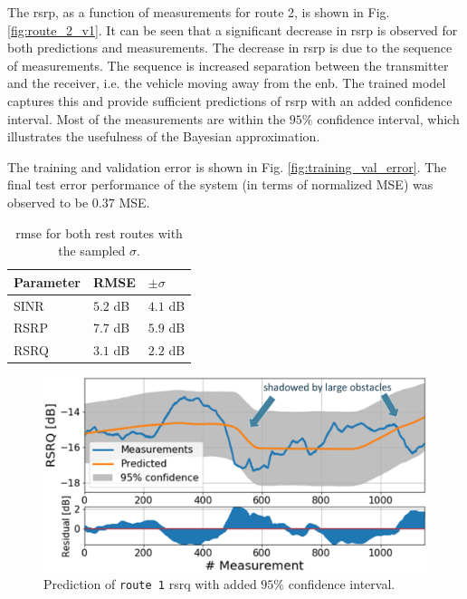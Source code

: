 The \gls{rsrp}, as a function of measurements for route 2, is shown in Fig. \ref{fig:route_2_v1}. It can be seen that a significant decrease in \gls{rsrp} is observed for both predictions and measurements. The decrease in \gls{rsrp} is due to the sequence of measurements. The sequence is increased separation between the transmitter and the receiver, i.e. the vehicle moving away from the \gls{enb}. The trained model captures this and provide sufficient predictions of \gls{rsrp} with an added confidence interval. Most of the measurements are within the $95\%$ confidence interval, which illustrates the usefulness of the Bayesian approximation. 

The training and validation error is shown in Fig. \ref{fig:training_val_error}. The final test error performance of the system (in terms of normalized MSE) was observed to be $\mathbf{0.37}$ MSE. 

\def\arraystretch{1.5}
\begin{table}[]
\centering
\begin{tabular}{@{}lll@{}}
\toprule
\textbf{Parameter} & RMSE   & $\pm \sigma$ \\ \midrule
SINR               & $5.2$ dB & $4.1$ dB       \\
RSRP               & $7.7$ dB & $5.9$ dB       \\
RSRQ               & $3.1$ dB & $2.2$ dB       \\ \bottomrule
\end{tabular}
\caption{\gls{rmse} for both rest routes with the sampled $\sigma$.}\label{tab:rmse_error_v1}
\end{table}



\begin{figure}
    \centering
    \includegraphics{chapters/part_pathloss/drive_test_minimzation_paper/route_1_predictions_5ab708662d60543b24f857a1_annotated.eps}
    \caption{Prediction of \texttt{route 1} \gls{rsrq} with added $95\%$ confidence interval.}
    \label{fig:route_1_v1}
\end{figure}



